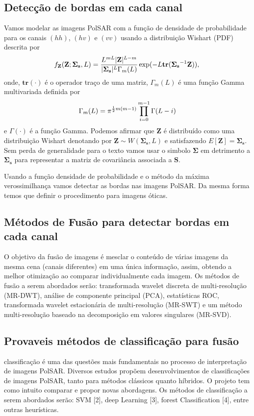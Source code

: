 \documentclass[runningheads]{llncs}
\begin{document}
\subsection{Detecção de bordas em cada canal}
 Vamos modelar as imagens PolSAR com a função de densidade de probabilidade para os canais $(hh)$, $(hv)$ e $(vv)$ usando a distribuição Wishart (PDF) descrita por
\begin{equation}
    f_{\mathbf{Z}}(\mathbf{Z};\mathbf{\Sigma_{s}},L)=\frac{L^{mL}|\mathbf{Z}|^{L-m}}{|\mathbf{\Sigma_{s}}|^{L}\Gamma_m(L)} \exp(-L\mathbf{tr}(\mathbf{\Sigma_{s}}^{-1}\mathbf{Z})), \\
\end{equation} 
onde, $\mathbf{tr}(\cdot)$ é o operador traço de uma matriz, $\Gamma_m(L)$ é uma função Gamma multivariada definida por
\begin{equation}\label{cap_acf_10}
	\Gamma_m(L)=\pi^{\frac{1}{2}m(m-1)} \prod_{i=0}^{m-1}\Gamma(L-i) \\
\end{equation}
e $\Gamma(\cdot)$ é a função Gamma. Podemos afirmar que $\mathbf{Z}$ é distribuído como uma distribuição Wishart denotando por $\mathbf{Z}\sim W(\mathbf{\Sigma_{s}}, L)$ e satisfazendo $E[\mathbf{Z}]=\mathbf{\Sigma_{s}}$. Sem perda de generalidade para o texto vamos usar o simbolo $\mathbf{\Sigma}$ em detrimento a $\mathbf{\Sigma_{s}}$ para representar a matriz de covariância associada a $\mathbf{S}$.
 
Usando a função densidade de probabilidade e o método da máxima verossimilhança vamos detectar as bordas nas imagens PolSAR. Da mesma forma temos que definir o procedimento para imagens óticas. 
\subsection{Métodos de Fusão para detectar bordas em cada canal}
O objetivo da fusão de imagens é mesclar o conteúdo de várias imagens da mesma cena (canais diferentes) em uma única informação, assim, obtendo a melhor otimização ao comparar individualmente cada imagem. Os métodos de fusão a serem abordados serão:  transformada wavelet discreta de multi-resolução (MR-DWT), análise de componente principal (PCA), estatísticas ROC, transformada wavelet estacionária de multi-resolução (MR-SWT) e um método multi-resolução baseado na decomposição em valores singulares (MR-SVD).


\subsection{Provaveis métodos de classificação para fusão}
classificação é uma das questões mais fundamentais no
processo de interpretação de imagens PolSAR. Diversos estudos propõem desenvolvimentos de classificações de imagens PolSAR, tanto para métodos clássicos quanto híbridos. O projeto tem como intuito comparar e propor novas abordagens. Os métodos de classificação a serem abordados serão: SVM [2], deep Learning [3], forest Classification [4], entre outras heurísticas.
\end{document}
